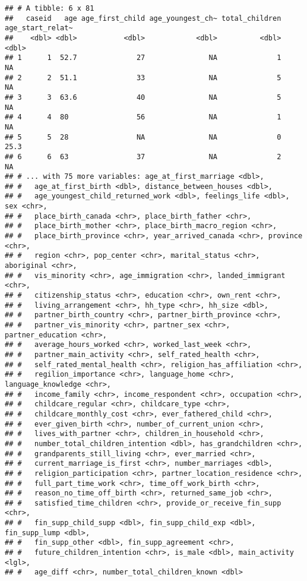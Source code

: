 \documentclass[
]{article}
\begin{document}
\begin{verbatim}
## # A tibble: 6 x 81
##   caseid   age age_first_child age_youngest_ch~ total_children age_start_relat~
##    <dbl> <dbl>           <dbl>            <dbl>          <dbl>            <dbl>
## 1      1  52.7              27               NA              1             NA  
## 2      2  51.1              33               NA              5             NA  
## 3      3  63.6              40               NA              5             NA  
## 4      4  80                56               NA              1             NA  
## 5      5  28                NA               NA              0             25.3
## 6      6  63                37               NA              2             NA  
## # ... with 75 more variables: age_at_first_marriage <dbl>,
## #   age_at_first_birth <dbl>, distance_between_houses <dbl>,
## #   age_youngest_child_returned_work <dbl>, feelings_life <dbl>, sex <chr>,
## #   place_birth_canada <chr>, place_birth_father <chr>,
## #   place_birth_mother <chr>, place_birth_macro_region <chr>,
## #   place_birth_province <chr>, year_arrived_canada <chr>, province <chr>,
## #   region <chr>, pop_center <chr>, marital_status <chr>, aboriginal <chr>,
## #   vis_minority <chr>, age_immigration <chr>, landed_immigrant <chr>,
## #   citizenship_status <chr>, education <chr>, own_rent <chr>,
## #   living_arrangement <chr>, hh_type <chr>, hh_size <dbl>,
## #   partner_birth_country <chr>, partner_birth_province <chr>,
## #   partner_vis_minority <chr>, partner_sex <chr>, partner_education <chr>,
## #   average_hours_worked <chr>, worked_last_week <chr>,
## #   partner_main_activity <chr>, self_rated_health <chr>,
## #   self_rated_mental_health <chr>, religion_has_affiliation <chr>,
## #   regilion_importance <chr>, language_home <chr>, language_knowledge <chr>,
## #   income_family <chr>, income_respondent <chr>, occupation <chr>,
## #   childcare_regular <chr>, childcare_type <chr>,
## #   childcare_monthly_cost <chr>, ever_fathered_child <chr>,
## #   ever_given_birth <chr>, number_of_current_union <chr>,
## #   lives_with_partner <chr>, children_in_household <chr>,
## #   number_total_children_intention <dbl>, has_grandchildren <chr>,
## #   grandparents_still_living <chr>, ever_married <chr>,
## #   current_marriage_is_first <chr>, number_marriages <dbl>,
## #   religion_participation <chr>, partner_location_residence <chr>,
## #   full_part_time_work <chr>, time_off_work_birth <chr>,
## #   reason_no_time_off_birth <chr>, returned_same_job <chr>,
## #   satisfied_time_children <chr>, provide_or_receive_fin_supp <chr>,
## #   fin_supp_child_supp <dbl>, fin_supp_child_exp <dbl>, fin_supp_lump <dbl>,
## #   fin_supp_other <dbl>, fin_supp_agreement <chr>,
## #   future_children_intention <chr>, is_male <dbl>, main_activity <lgl>,
## #   age_diff <chr>, number_total_children_known <dbl>
\end{verbatim}
\end{document}
